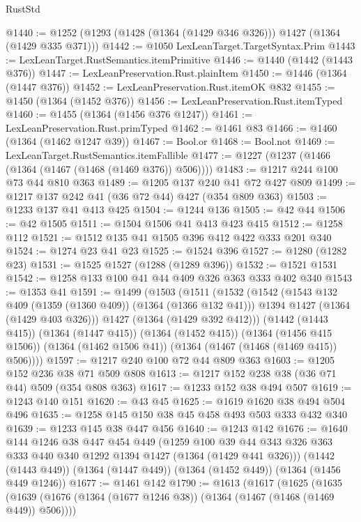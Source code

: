 \begin{lexlean}{RustStd}
\begin{coremodule}
@1440 := @1252 (@1293 (@1428 (@1364 (@1429 @346 @326))) @1427 (@1364 (@1429 @335 @371)))
@1442 := @1050 LexLeanTarget.TargetSyntax.Prim
@1443 := LexLeanTarget.RustSemantics.itemPrimitive
@1446 := @1440 (@1442 (@1443 @376))
@1447 := LexLeanPreservation.Rust.plainItem
@1450 := @1446 (@1364 (@1447 @376))
@1452 := LexLeanPreservation.Rust.itemOK @832
@1455 := @1450 (@1364 (@1452 @376))
@1456 := LexLeanPreservation.Rust.itemTyped
@1460 := @1455 (@1364 (@1456 @376 @1247))
@1461 := LexLeanPreservation.Rust.primTyped
@1462 := @1461 @83
@1466 := @1460 (@1364 (@1462 @1247 @39))
@1467 := Bool.or
@1468 := Bool.not
@1469 := LexLeanTarget.RustSemantics.itemFallible
@1477 := @1227 (@1237 (@1466 (@1364 (@1467 (@1468 (@1469 @376)) @506))))
@1483 := @1217 @244 @100 @73 @44 @810 @363
@1489 := @1205 @137 @240 @41 @72 @427 @809
@1499 := @1217 @137 @242 @41 (@36 @72 @44) @427 (@354 @809 @363)
@1503 := @1233 @137 @41 @413 @425
@1504 := @1244 @136
@1505 := @42 @44
@1506 := @42 @1505
@1511 := @1504 @1506 @41 @413 @423 @415
@1512 := @1258 @112
@1521 := @1512 @135 @41 @1505 @396 @412 @422 @333 @201 @340
@1524 := @1274 @23 @41 @23
@1525 := @1524 @396
@1527 := @1280 (@1282 @23)
@1531 := @1525 @1527 (@1288 (@1289 @396))
@1532 := @1521 @1531
@1542 := @1258 @133 @100 @41 @44 @409 @326 @363 @333 @402 @340
@1543 := @1353 @41
@1591 := @1499
    (@1503
      (@1511
        (@1532
          (@1542
            (@1543 @132 @409 (@1359 (@1360 @409)) (@1364 (@1366 @132 @41)))
            @1394
            @1427
            (@1364 (@1429 @403 @326)))
          @1427
          (@1364 (@1429 @392 @412)))
        (@1442 (@1443 @415))
        (@1364 (@1447 @415))
        (@1364 (@1452 @415))
        (@1364 (@1456 @415 @1506))
        (@1364 (@1462 @1506 @41))
        (@1364 (@1467 (@1468 (@1469 @415)) @506))))
@1597 := @1217 @240 @100 @72 @44 @809 @363
@1603 := @1205 @152 @236 @38 @71 @509 @808
@1613 := @1217 @152 @238 @38 (@36 @71 @44) @509 (@354 @808 @363)
@1617 := @1233 @152 @38 @494 @507
@1619 := @1243 @140 @151
@1620 := @43 @45
@1625 := @1619 @1620 @38 @494 @504 @496
@1635 := @1258 @145 @150 @38 @45 @458 @493 @503 @333 @432 @340
@1639 := @1233 @145 @38 @447 @456
@1640 := @1243 @142
@1676 := @1640
    @144
    @1246
    @38
    @447
    @454
    @449
    (@1259 @100 @39 @44 @343 @326 @363 @333 @440 @340 @1292 @1394 @1427 (@1364 (@1429 @441 @326)))
    (@1442 (@1443 @449))
    (@1364 (@1447 @449))
    (@1364 (@1452 @449))
    (@1364 (@1456 @449 @1246))
@1677 := @1461 @142
@1790 := @1613
    (@1617
      (@1625
        (@1635
          (@1639 (@1676 (@1364 (@1677 @1246 @38)) (@1364 (@1467 (@1468 (@1469 @449)) @506))))

\end{coremodule}
\end{lexlean}
